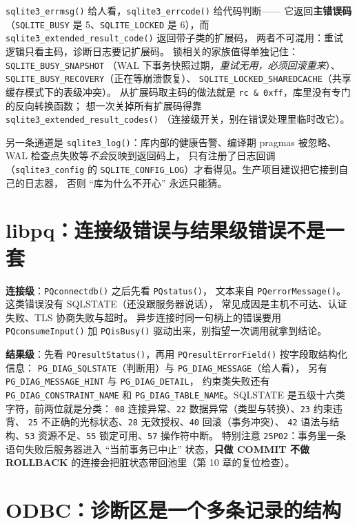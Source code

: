 \documentclass[12pt,a4paper,fontset=fandol]{ctexbook}
\newcommand{\Fn}[1]{\texttt{#1()}}
\newcommand{\Tp}[1]{\texttt{#1}}
\begin{document}
\Fn{sqlite3\_errmsg} 给人看，\Fn{sqlite3\_errcode} 给代码判断——
它返回\textbf{主错误码}（\Tp{SQLITE\_BUSY} 是 5、\Tp{SQLITE\_LOCKED}
是 6），而 \Fn{sqlite3\_extended\_result\_code} 返回带子类的扩展码，
两者不可混用：重试逻辑只看主码，诊断日志要记扩展码。
锁相关的家族值得单独记住：\Tp{SQLITE\_BUSY\_SNAPSHOT}
（WAL 下事务快照过期，\emph{重试无用，必须回滚重来}）、
\Tp{SQLITE\_BUSY\_RECOVERY}（正在等崩溃恢复）、
\Tp{SQLITE\_LOCKED\_SHAREDCACHE}（共享缓存模式下的表级冲突）。
从扩展码取主码的做法就是 \Tp{rc \& 0xff}，库里没有专门的反向转换函数；
想一次关掉所有扩展码得靠 \Fn{sqlite3\_extended\_\allowbreak result\_\allowbreak codes}
（连接级开关，别在错误处理里临时改它）。

另一条通道是 \Fn{sqlite3\_log}：库内部的健康告警、编译期 pragmas
被忽略、WAL 检查点失败等\emph{不会}反映到返回码上，
只有注册了日志回调（\Tp{sqlite3\_config} 的
\Tp{SQLITE\_CONFIG\_LOG}）才看得见。生产项目建议把它接到自己的日志器，
否则 ``库为什么不开心'' 永远只能猜。

\section{libpq：连接级错误与结果级错误不是一套}

\textbf{连接级}：\Fn{PQconnectdb} 之后先看 \Fn{PQstatus}，
文本来自 \Fn{PQerrorMessage}。这类错误没有 SQLSTATE（还没跟服务器说话），
常见成因是主机不可达、认证失败、TLS 协商失败与超时。
异步连接时同一句柄上的错误要用 \Fn{PQconsumeInput} 加 \Fn{PQisBusy}
驱动出来，别指望一次调用就拿到结论。

\textbf{结果级}：先看 \Fn{PQresultStatus}，再用
\Fn{PQresultErrorField} 按字段取结构化信息：
\Tp{PG\_DIAG\_SQLSTATE}（判断用）与 \Tp{PG\_DIAG\_MESSAGE}（给人看），
另有 \Tp{PG\_DIAG\_MESSAGE\_HINT} 与 \Tp{PG\_DIAG\_DETAIL}，
约束类失败还有 \Tp{PG\_DIAG\_CONSTRAINT\_NAME} 和
\Tp{PG\_DIAG\_TABLE\_NAME}。SQLSTATE 是五级十六类字符，前两位就是分类：
\Tp{08} 连接异常、\Tp{22} 数据异常（类型与转换）、\Tp{23} 约束违背、
\Tp{25} 不正确的光标状态、\Tp{28} 无效授权、\Tp{40} 回滚（事务冲突）、
\Tp{42} 语法与结构、\Tp{53} 资源不足、\Tp{55} 锁定可用、\Tp{57} 操作符中断。
特别注意 \Tp{25P02}：事务里一条语句失败后服务器进入
``当前事务已中止'' 状态，\textbf{只做 COMMIT 不做 ROLLBACK}
的连接会把脏状态带回池里（第 10 章的复位检查）。

\section{ODBC：诊断区是一个多条记录的结构}
\end{document}
